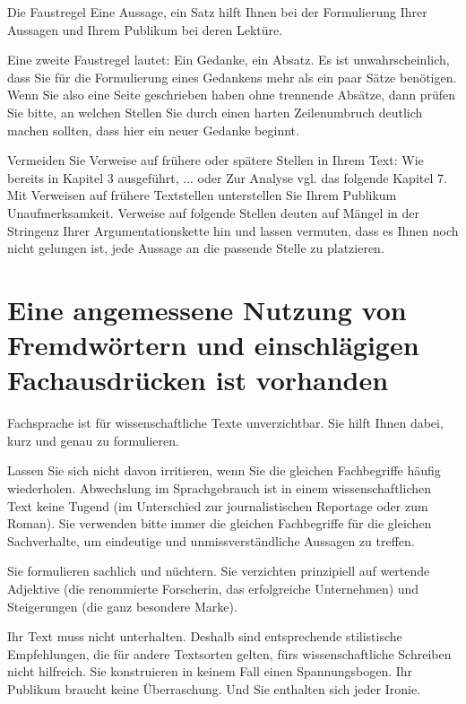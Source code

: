 Die Faustregel \glqq Eine Aussage, ein Satz\grqq{} hilft Ihnen bei der Formulierung Ihrer Aussagen und Ihrem Publikum bei deren Lektüre.

Eine zweite Faustregel lautet: \glqq Ein Gedanke, ein Absatz.\grqq{} Es ist unwahrscheinlich, dass Sie für die Formulierung eines Gedankens mehr als ein paar Sätze benötigen. Wenn Sie also eine Seite geschrieben haben ohne trennende Absätze, dann prüfen Sie bitte, an welchen Stellen Sie durch einen harten Zeilenumbruch deutlich machen sollten, dass hier ein neuer Gedanke beginnt.

Vermeiden Sie Verweise auf frühere oder spätere Stellen in Ihrem Text: \glqq Wie bereits in Kapitel 3 ausgeführt, ...\grqq{} oder \glqq Zur Analyse vgl. das folgende Kapitel 7.\grqq{} Mit Verweisen auf frühere Textstellen unterstellen Sie Ihrem Publikum Unaufmerksamkeit. Verweise auf folgende Stellen deuten auf Mängel in der Stringenz Ihrer Argumentationskette hin und lassen vermuten, dass es Ihnen noch nicht gelungen ist, jede Aussage an die passende Stelle zu platzieren.

\section{Eine angemessene Nutzung von Fremdwörtern und einschlägigen Fachausdrücken ist vorhanden}
\label{sec:fremdwoerter-fachausdruecke}

Fachsprache ist für wissenschaftliche Texte unverzichtbar. Sie hilft Ihnen dabei, kurz und genau zu formulieren.

Lassen Sie sich nicht davon irritieren, wenn Sie die gleichen Fachbegriffe häufig wiederholen. Abwechslung im Sprachgebrauch ist in einem wissenschaftlichen Text keine Tugend (im Unterschied zur journalistischen Reportage oder zum Roman). Sie verwenden bitte immer die gleichen Fachbegriffe für die gleichen Sachverhalte, um eindeutige und unmissverständliche Aussagen zu treffen.

Sie formulieren sachlich und nüchtern. Sie verzichten prinzipiell auf wertende Adjektive (\glqq die renommierte Forscherin\grqq{}, \glqq das erfolgreiche Unternehmen\grqq{}) und Steigerungen (\glqq die ganz besondere Marke\grqq{}).

Ihr Text muss nicht unterhalten. Deshalb sind entsprechende stilistische Empfehlungen, die für andere Textsorten gelten, fürs wissenschaftliche Schreiben nicht hilfreich. Sie konstruieren in keinem Fall einen Spannungsbogen. Ihr Publikum braucht keine Überraschung. Und Sie enthalten sich jeder Ironie.

